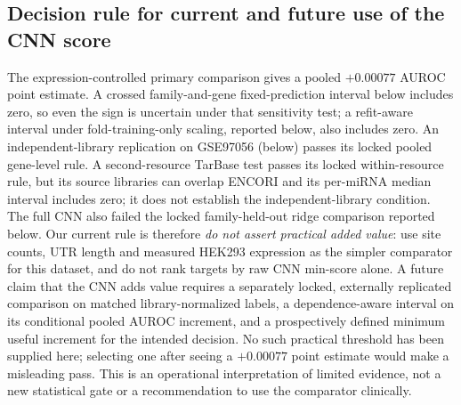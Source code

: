\documentclass[11pt]{article}
\begin{document}
\subsection{Decision rule for current and future use of the CNN score}
The expression-controlled primary comparison gives a pooled $+0.00077$
AUROC point estimate. A crossed family-and-gene fixed-prediction interval
below includes zero, so even the sign is uncertain under that sensitivity
test; a refit-aware interval under fold-training-only scaling, reported
below, also includes zero. An independent-library replication on GSE97056 (below) passes its locked pooled gene-level rule. A
second-resource TarBase test passes its locked within-resource rule, but
its source libraries can overlap ENCORI and its per-miRNA median interval
includes zero; it does not establish the independent-library condition.
The full CNN also failed the locked family-held-out ridge
comparison reported below. Our current rule is therefore \emph{do not
assert practical added value}: use site counts, UTR length and measured
HEK293 expression as the simpler comparator for this dataset, and do not
rank targets by raw CNN min-score alone. A future claim that the CNN adds
value requires a separately locked, externally replicated comparison on
matched library-normalized labels, a dependence-aware interval on its
conditional pooled AUROC increment, and a prospectively defined
minimum useful increment for the intended decision. No such practical
threshold has been supplied here; selecting one after seeing a $+0.00077$
point estimate would make a misleading pass. This is an operational
interpretation of limited evidence, not a new statistical gate or a
recommendation to use the comparator clinically.
\end{document}
